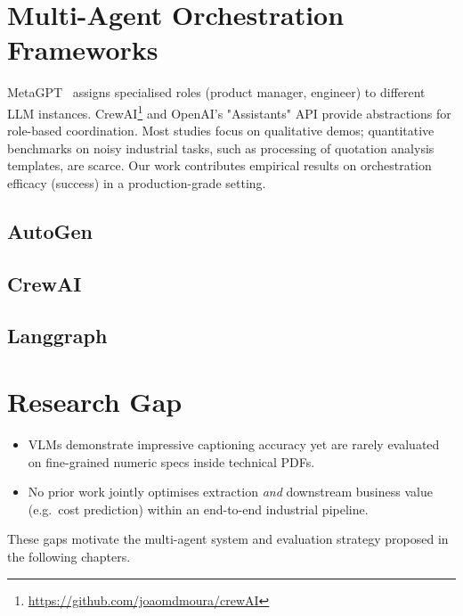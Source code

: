 \section{Multi-Agent Orchestration Frameworks}
MetaGPT~\cite{hong2023metagpt} assigns specialised roles (product manager, engineer) to different LLM instances.  
CrewAI\footnote{\url{https://github.com/joaomdmoura/crewAI}} and OpenAI's "Assistants" API provide abstractions for role-based coordination.  
Most studies focus on qualitative demos; quantitative benchmarks on noisy industrial tasks, such as processing of quotation analysis templates, are scarce.  
Our work contributes empirical results on orchestration efficacy (success) in a production-grade setting.

\subsection{AutoGen}
\subsection{CrewAI}
\subsection{Langgraph}
\section{Research Gap}
\begin{itemize}
  \item VLMs demonstrate impressive captioning accuracy yet are rarely evaluated on fine-grained numeric specs inside technical PDFs.
  \item No prior work jointly optimises extraction \emph{and} downstream business value (e.g.\ cost prediction) within an end-to-end industrial pipeline.
\end{itemize}
These gaps motivate the multi-agent system and evaluation strategy proposed in the following chapters.
